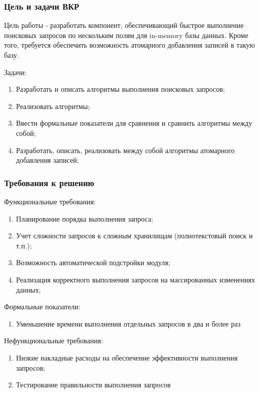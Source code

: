 \documentclass{beamer}
\begin{document}
\begin{frame}\frametitle{Цель и задачи ВКР}
    Цель работы - разработать компонент, обеспечивающий быстрое выполнение поисковых запросов по нескольким полям для in-memory базы данных. Кроме того, требуется обеспечить возможность атомарного добавления записей в такую базу.
    
    Задачи:
    \begin{enumerate}
        \item Разработать и описать алгоритмы выполнения поисковых запросов;
        \item Реализовать алгоритмы;
        \item Ввести формальные показатели для сравнения и сравнить алгоритмы между собой; 
        \item Разработать, описать, реализовать между собой алгоритмы атомарного добавления записей;
    \end{enumerate}
\end{frame}

\begin{frame}\frametitle{Требования к решению}
    Функциональные требования:
        \begin{enumerate}\itemsep0pt \parskip0pt 
            \item Планирование порядка выполнения запроса;
            \item Учет сложности запросов к сложным хранилищам (полнотекстовый поиск и т.п.);
            \item Возможность автоматической подстройки модуля;
            \item Реализация корректного выполнения запросов на массированных изменениях данных;
        \end{enumerate}
    Формальные показатели:
        \begin{enumerate}\itemsep0pt \parskip0pt  
            \item Уменьшение времени выполнения отдельных запросов в два и более раз
        \end{enumerate}
    Нефункциональные требования:
        \begin{enumerate}\itemsep0pt \parskip0pt  
                \item Низкие накладные расходы на обеспечение эффективности выполнения запросов;
                \item Тестирование правильности выполнения запросов
        \end{enumerate}
\end{frame}
\end{document}
